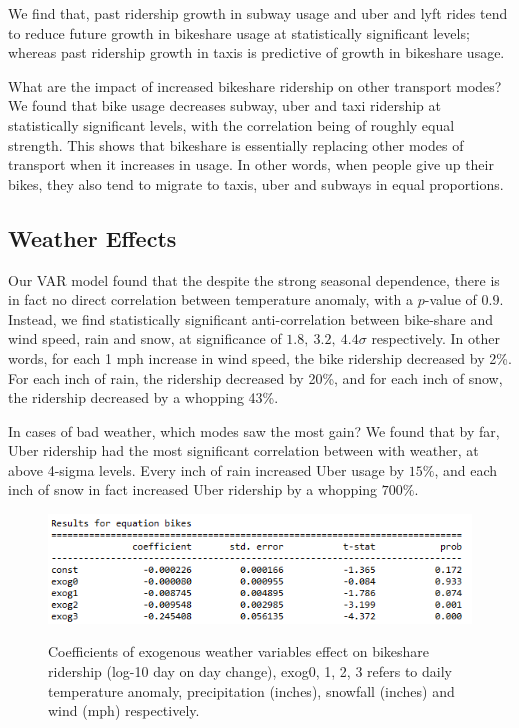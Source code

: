 \documentclass[12pt]{article}
\begin{document}
We find that, past ridership growth in subway usage and uber and lyft rides tend to reduce future growth in bikeshare usage at statistically significant levels; whereas past ridership growth in taxis is predictive of growth in bikeshare usage.

What are the impact of increased bikeshare ridership on other transport modes? We found that bike usage decreases subway, uber and taxi ridership at statistically significant levels, with the correlation being of roughly equal strength. This shows that bikeshare is essentially replacing other modes of transport when it increases in usage. In other words, when people give up their bikes, they also tend to migrate to taxis, uber and subways in equal proportions.

\subsection*{Weather Effects}
Our VAR model found that the despite the strong seasonal dependence, there is in fact no direct correlation between temperature anomaly, with a $p$-value of $0.9$. Instead, we find statistically significant anti-correlation between bike-share and wind speed, rain and snow, at significance of $1.8, ~3.2, ~4.4 \sigma$ respectively. In other words, for each 1 mph increase in wind speed, the bike ridership decreased by 2\%. For each inch of rain, the ridership decreased by 20\%, and for each inch of snow, the ridership decreased by a whopping 43\%.

In cases of bad weather, which modes saw the most gain? We found that by far, Uber ridership had the most significant correlation between with weather, at above 4-sigma levels. Every inch of rain increased Uber usage by $15\%$, and each inch of snow in fact increased Uber ridership by a whopping $700\%$. 


\begin{figure}[htbp]
    \includegraphics[scale=0.8]{exog.PNG}
    \label{fig:weather_coef}
    \caption{Coefficients of exogenous weather variables effect on bikeshare ridership (log-10 day on day change), exog0, 1, 2, 3 refers to daily temperature anomaly, precipitation (inches), snowfall (inches) and wind (mph) respectively.}
\end{figure}
\end{document}
